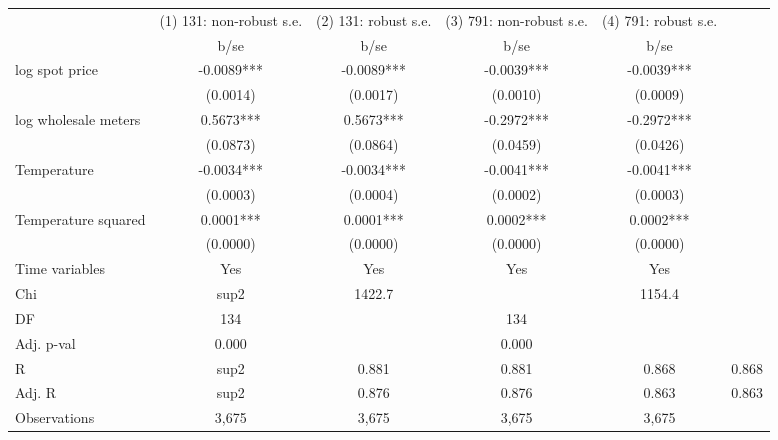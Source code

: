 \begin{tabular}{lcccc}\toprule
                    &(1) 131: non-robust s.e.   &(2) 131: robust s.e.   &(3) 791: non-robust s.e.   &(4) 791: robust s.e.   \\
                    &        b/se   &        b/se   &        b/se   &        b/se   \\
\midrule
log spot price      &     -0.0089***&     -0.0089***&     -0.0039***&     -0.0039***\\
                    &    (0.0014)   &    (0.0017)   &    (0.0010)   &    (0.0009)   \\
log wholesale meters&      0.5673***&      0.5673***&     -0.2972***&     -0.2972***\\
                    &    (0.0873)   &    (0.0864)   &    (0.0459)   &    (0.0426)   \\
Temperature         &     -0.0034***&     -0.0034***&     -0.0041***&     -0.0041***\\
                    &    (0.0003)   &    (0.0004)   &    (0.0002)   &    (0.0003)   \\
Temperature squared &      0.0001***&      0.0001***&      0.0002***&      0.0002***\\
                    &    (0.0000)   &    (0.0000)   &    (0.0000)   &    (0.0000)   \\
Time variables      &         Yes   &         Yes   &         Yes   &         Yes   \\
\midrule
Chi&sup2            &      1422.7   &               &      1154.4   &               \\
DF                  &         134   &               &         134   &               \\
Adj. p-val          &       0.000   &               &       0.000   &               \\
R&sup2              &       0.881   &       0.881   &       0.868   &       0.868   \\
Adj. R&sup2         &       0.876   &       0.876   &       0.863   &       0.863   \\
Observations        &       3,675   &       3,675   &       3,675   &       3,675   \\
\bottomrule\end{tabular}
